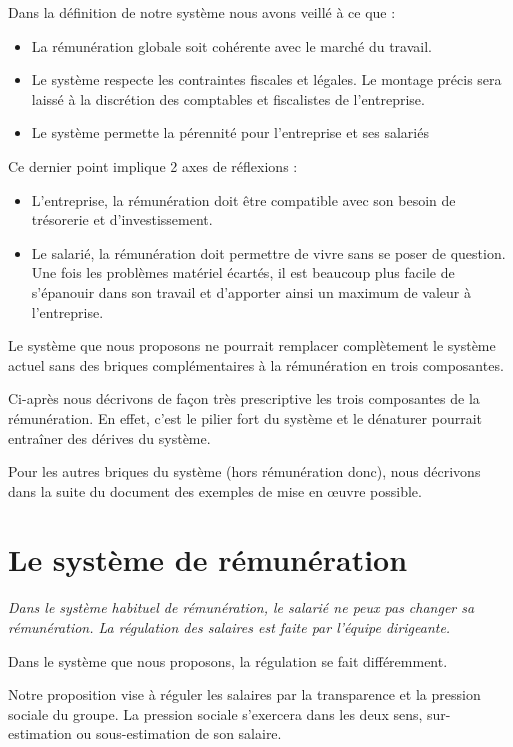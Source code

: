 \documentclass[12pt]{article}
\newcommand{\actuel}[1]{%
  \begin{tcolorbox}[colframe=DarkButter,boxrule=2pt,arc=4pt,left=6pt,right=6pt,top=6pt,bottom=6pt,boxsep=0pt,colback=Aluminium2]
    \textit{#1}
  \end{tcolorbox}
}
\begin{document}
 Dans la définition de notre système nous avons veillé à ce que :
 \begin{itemize}
   \item La rémunération globale soit cohérente avec le marché du travail.
   \item Le système respecte les contraintes fiscales et légales. Le montage précis sera  laissé à la discrétion des comptables et fiscalistes de l’entreprise.
   \item Le système permette la pérennité pour l’entreprise et ses salariés
 \end{itemize}

 Ce dernier point implique 2 axes de réflexions :  
 \begin{itemize}
    \item L’entreprise, la rémunération doit être compatible avec son besoin de trésorerie et d’investissement.
    \item Le salarié, la rémunération doit permettre de vivre sans se poser de question. Une fois les problèmes matériel écartés, il est beaucoup plus facile de s’épanouir dans son travail et d'apporter ainsi un maximum de valeur à l’entreprise.
 \end{itemize}

 Le système que nous proposons ne pourrait remplacer complètement le système actuel sans des briques complémentaires à la rémunération en trois composantes. 

 Ci-après nous décrivons de façon très prescriptive les trois composantes de la rémunération. En effet, c'est le pilier fort du système et le dénaturer pourrait entraîner des dérives du système. 
 
 Pour les autres briques du système (hors rémunération donc), nous décrivons dans la suite du document des exemples de mise en œuvre possible. 

\section{Le système de rémunération}
  \actuel{Dans le système habituel de rémunération, le salarié ne peux pas changer sa rémunération. La régulation des salaires est faite par l’équipe dirigeante.}

 Dans le système que nous proposons, la régulation se fait différemment. 

 Notre proposition vise à réguler les salaires par la transparence et la pression sociale du groupe. La pression sociale s’exercera dans les deux sens, sur-estimation ou sous-estimation de son salaire. 
\end{document}
